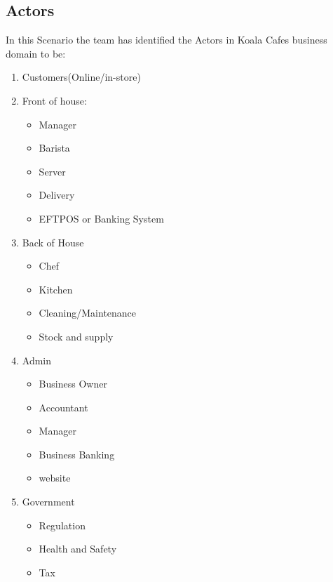 \documentclass{article}
\begin{document}
\subsection{Actors} 

In this Scenario the team has identified the Actors in Koala Cafes business domain to be:


\begin{enumerate}
    \item Customers(Online/in-store)
    \item Front of house:
    \begin{itemize}
        \item Manager
        \item Barista
        \item Server
        \item Delivery
        \item EFTPOS or Banking System
    \end{itemize}
    \item Back of House
    \begin{itemize}
        \item Chef
        \item Kitchen
        \item Cleaning/Maintenance
        \item Stock and supply
    \end{itemize}
    \item Admin
    \begin{itemize}
        \item Business Owner
        \item Accountant
        \item Manager
        \item Business Banking
        \item website
    \end{itemize}
    \item Government
    \begin{itemize}
        \item Regulation
        \item Health and Safety
        \item Tax
    \end{itemize}
\end{enumerate}
\end{document}
